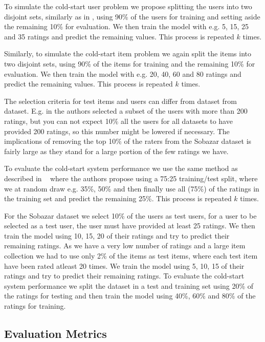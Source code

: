 To simulate the cold-start user problem we propose splitting the users into two disjoint
sets, similarly as in \cite{Stern2009, Lam2008}, using 90\% of the users for training and
setting aside the remaining 10\% for evaluation. We then train the model with e.g. 5, 15,
25 and 35 ratings and predict the remaining values. This process is repeated $k$ times.

Similarly, to simulate the cold-start item problem we again split the items into two
disjoint sets, using 90\% of the items for training and the remaining 10\% for
evaluation.  We then train the model with e.g. 20, 40, 60 and 80 ratings and predict
the remaining values. This process is repeated $k$ times.

The selection criteria for test items and users can differ from dataset from dataset.
E.g. in \cite{Rashid2002, Rashid2008} the authors selected a subset of the users with
more than 200 ratings, but you can not expect 10\% all the users for all datasets
to have provided 200 ratings, so this number might be lowered if necessary. The 
implications of removing the top 10\% of the raters from the Sobazar dataset is 
fairly large as they stand for a large portion of the few ratings we have.

To evaluate the cold-start system performance we use the same method as described
in ~\cite{Agarwal2009} where the authors propose using a 75:25 training/test split,
where we at random draw e.g. 35\%, 50\% and then finally use all (75\%) of the
ratings in the training set and predict the remaining 25\%. This process is
repeated $k$ times.

For the Sobazar dataset we select 10\% of the users as test users, for a user to be
selected as a test user, the user must have provided at least 25 ratings. We then train
the model using 10, 15, 20 of their ratings and try to predict their remaining ratings.
As we have a very low number of ratings and a large item collection we had to use
only 2\% of the items as test items, where each test item have been rated atleast 20 times.
We train the model using 5, 10, 15 of their ratings and try to predict their remaining
ratings. To evaluate the cold-start system performance we split the dataset in a test
and training set using 20\% of the ratings for testing and then train the model
using 40\%, 60\% and 80\% of the ratings for training.




\subsection{Evaluation Metrics}

